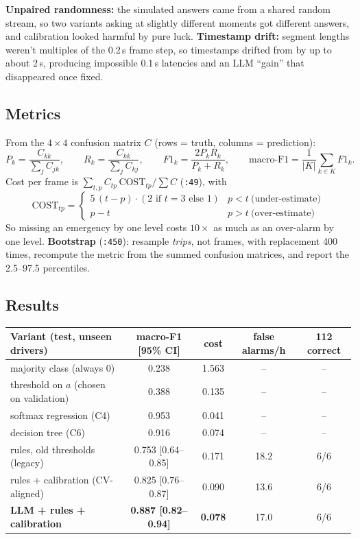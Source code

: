 \documentclass[11pt,a4paper]{article}
\newcommand{\code}[1]{\texttt{\detokenize{#1}}}
\newcommand{\fref}[2]{\texttt{\textcolor{s1}{\detokenize{#1}:#2}}}
\newcommand{\thead}[1]{\sffamily\bfseries\small #1}
\begin{document}
\begin{pitfall}
\textbf{Unpaired randomness:} the simulated answers came from a shared random stream, so two variants asking at
slightly different moments got different answers, and calibration looked harmful by pure luck.
\textbf{Timestamp drift:} segment lengths weren't multiples of the 0.2\,s frame step, so timestamps drifted
from \code{index/5} by up to about 2\,s, producing impossible 0.1\,s latencies and an LLM ``gain'' that
disappeared once fixed.
\end{pitfall}

\subsection{Metrics}
From the $4\times4$ confusion matrix $C$ (rows = truth, columns = prediction):
\[
P_k = \frac{C_{kk}}{\sum_j C_{jk}},\qquad R_k = \frac{C_{kk}}{\sum_j C_{kj}},\qquad
F1_k = \frac{2P_kR_k}{P_k+R_k},\qquad \text{macro-F1} = \frac{1}{|K|}\sum_{k\in K} F1_k .
\]
Cost per frame is $\sum_{t,p} C_{tp}\,\text{COST}_{tp} / \sum C$ (\fref{evaluate.py}{49}), with
\[
\text{COST}_{tp} = \begin{cases} 5\,(t-p)\cdot(2 \text{ if } t=3 \text{ else } 1) & p<t \ \text{(under-estimate)}\\ p-t & p>t \ \text{(over-estimate)}\end{cases}
\]
So missing an emergency by one level costs $10\times$ as much as an over-alarm by one level.
\textbf{Bootstrap} (\fref{evaluate.py}{450}): resample \emph{trips}, not frames, with replacement 400 times,
recompute the metric from the summed confusion matrices, and report the 2.5--97.5 percentiles.

\subsection{Results}
\begin{tabularx}{\textwidth}{@{}Y c c c c@{}}
\toprule
\thead{Variant (test, unseen drivers)} & \thead{macro-F1 [95\% CI]} & \thead{cost} & \thead{false alarms/h} & \thead{112 correct} \\
\midrule
majority class (always 0) & 0.238 & 1.563 & -- & -- \\
threshold on $a$ (chosen on validation) & 0.388 & 0.135 & -- & -- \\
softmax regression (C4) & 0.953 & 0.041 & -- & -- \\
decision tree (C6) & 0.916 & 0.074 & -- & -- \\
rules, old thresholds (legacy) & 0.753 [0.64--0.85] & 0.171 & 18.2 & 6/6 \\
rules + calibration (CV-aligned) & 0.825 [0.76--0.87] & 0.090 & 13.6 & 6/6 \\
\textbf{LLM + rules + calibration} & \textbf{0.887 [0.82--0.94]} & \textbf{0.078} & 17.0 & 6/6 \\
\bottomrule
\end{tabularx}
\end{document}
